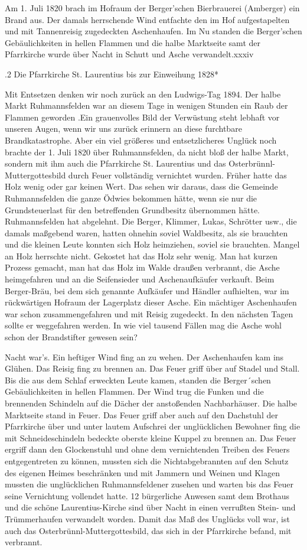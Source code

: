 \documentclass{book}
\begin{document}
Am 1. Juli 1820 brach im Hofraum der Berger'schen Bierbrauerei (Amberger) ein
Brand aus. Der damals herrschende Wind entfachte den im Hof aufgestapelten und
mit Tannenreisig zugedeckten Aschenhaufen. Im Nu standen die Berger'schen
Gebäulichkeiten in hellen Flammen und die halbe Marktseite samt der Pfarrkirche
wurde über Nacht in Schutt und Asche verwandelt.xxxiv

.2 Die Pfarrkirche St. Laurentius bis zur Einweihung 1828*

Mit Entsetzen denken wir noch zurück an den Ludwigs-Tag 1894. Der halbe Markt
Ruhmannsfelden war an diesem Tage in wenigen Stunden ein Raub der Flammen
geworden .Ein grauenvolles Bild der Verwüstung steht lebhaft vor unseren Augen,
wenn wir uns zurück erinnern an diese furchtbare Brandkatastrophe. Aber ein viel
größeres und entsetzlicheres Unglück noch brachte der 1. Juli 1820 über
Ruhmannsfelden, da nicht bloß der halbe Markt, sondern mit ihm auch die
Pfarrkirche St. Laurentius und das Osterbrünnl-Muttergottesbild durch Feuer
vollständig vernichtet wurden. Früher hatte das Holz wenig oder gar keinen Wert.
Das sehen wir daraus, dass die Gemeinde Ruhmannsfelden die ganze Ödwies bekommen
hätte, wenn sie nur die Grundsteuerlast für den betreffenden Grundbesitz
übernommen hätte. Ruhmannsfelden hat abgelehnt. Die Berger, Klimmer, Lukas,
Schrötter usw., die damals maßgebend waren, hatten ohnehin soviel Waldbesitz,
als sie brauchten und die kleinen Leute konnten sich Holz heimziehen, soviel sie
brauchten. Mangel an Holz herrschte nicht. Gekostet hat das Holz sehr wenig. Man
hat kurzen Prozess gemacht, man hat das Holz im Walde draußen verbrannt, die
Asche heimgefahren und an die Seifensieder und Aschenaufkäufer verkauft. Beim
Berger-Bräu, bei dem sich genannte Aufkäufer und Händler aufhielten, war im
rückwärtigen Hofraum der Lagerplatz dieser Asche. Ein mächtiger Aschenhaufen war
schon zusammengefahren und mit Reisig zugedeckt. In den nächsten Tagen sollte er
weggefahren werden. In wie viel tausend Fällen mag die Asche wohl schon der
Brandstifter gewesen sein?

Nacht war's. Ein heftiger Wind fing an zu wehen. Der Aschenhaufen kam ins
Glühen. Das Reisig fing zu brennen an. Das Feuer griff über auf Stadel und
Stall. Bis die aus dem Schlaf erweckten Leute kamen, standen die Berger´schen
Gebäulichkeiten in hellen Flammen. Der Wind trug die Funken und die brennenden
Schindeln auf die Dächer der anstoßenden Nachbarhäuser. Die halbe Marktseite
stand in Feuer. Das Feuer griff aber auch auf den Dachstuhl der Pfarrkirche über
und unter lautem Aufschrei der unglücklichen Bewohner fing die mit
Schneideschindeln bedeckte oberste kleine Kuppel zu brennen an. Das Feuer
ergriff dann den Glockenstuhl und ohne dem vernichtenden Treiben des Feuers
entgegentreten zu können, mussten sich die Nichtabgebrannten auf den Schutz des
eigenen Heimes beschränken und mit Jammern und Weinen und Klagen mussten die
unglücklichen Ruhmannsfeldener zusehen und warten bis das Feuer seine
Vernichtung vollendet hatte. 12 bürgerliche Anwesen samt dem Brothaus und die
schöne Laurentius-Kirche sind über Nacht in einen verrußten Stein- und
Trümmerhaufen verwandelt worden. Damit das Maß des Unglücks voll war, ist auch
das Osterbrünnl-Muttergottesbild, das sich in der Pfarrkirche befand, mit
verbrannt.
\end{document}
